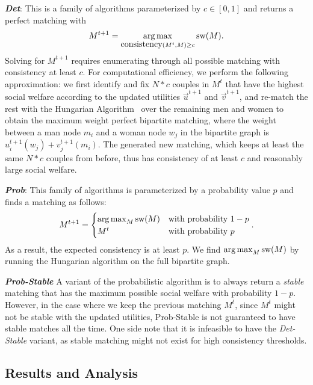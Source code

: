 \textit{\textbf{Det}}: This is a family of algorithms parameterized by $c \in [0, 1]$ and returns a perfect matching with $$M^{t+1} = \operatorname*{arg\,max}_{\mbox{consistency}(M^t, M) \ge c}{\mbox{sw}(M)}.$$
Solving for $M^{t+1}$ requires enumerating through all possible matching with consistency at least $c$. For computational efficiency, we perform the following approximation: we first identify and fix $N * c$ couples in $M^t$ that have the highest social welfare according to the updated utilities $\overrightarrow{u}^{t+1}$ and $\overrightarrow{v}^{t+1}$, and re-match the rest with the Hungarian Algorithm~\cite{Kuhn55thehungarian,Kuhn56thehungarian,Munkres1957Assignment} over the remaining men and women to obtain the maximum weight perfect bipartite matching, where the weight between a man node $m_i$ and a woman node $w_j$ in the bipartite graph is $u_i^{t+1}(w_j) + v_j^{t+1}(m_i)$. The generated new matching, which keeps at least the same $N*c$ couples from before, thus has consistency of at least $c$ and reasonably large social welfare.

\textit{\textbf{Prob}}: This family of algorithms is parameterized by a probability value $p$ and finds a matching as follows:
$$M^{t+1} = \begin{cases} \operatorname*{arg\,max}_M{\mbox{sw}(M)} &\text{with probability $1-p$}\\ M^t &\text{with probability $p$}\end{cases}.$$
As a result, the expected consistency is at least $p$. We find $\operatorname*{arg\,max}_M{\mbox{sw}(M)}$ by running the Hungarian algorithm on the full bipartite graph.

\textit{\textbf{Prob-Stable}} A variant of the probabilistic algorithm is to always return a \textit{stable} matching that has the maximum possible social welfare with probability $1-p$. However, in the case where we keep the previous matching $M^t$, since $M^t$ might not be stable with the updated utilities, Prob-Stable is not guaranteed to have stable matches all the time. One side note that it is infeasible to have the \textit{Det-Stable} variant, as stable matching might not exist for high consistency thresholds.


\subsection{Results and Analysis}


